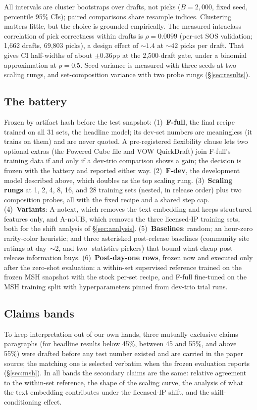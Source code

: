 All intervals are cluster bootstraps over drafts, not picks
($B{=}2{,}000$, fixed seed, percentile 95\% CIs); paired comparisons share
resample indices. Clustering matters little, but the choice is grounded
empirically. The measured intraclass correlation of pick correctness
within drafts is $\rho = 0.0099$ (per-set SOS validation; 1{,}662 drafts,
69{,}803 picks), a design effect of ${\sim}1.4$ at ${\sim}42$ picks per
draft. That gives CI half-widths of about $\pm0.36$pp at the
2{,}500-draft gate, under a binomial approximation at $p{=}0.5$. Seed
variance is measured with three seeds at two scaling rungs, and
set-composition variance with two probe rungs (\S\ref{sec:results}).

\subsection{The battery}

Frozen by artifact hash before the test snapshot:
(1)~\textbf{F-full}, the final recipe trained on all 31 sets, the headline
model; its dev-set numbers are meaningless (it trains on them) and are
never quoted. A pre-registered flexibility clause lets two optional extras
(the Powered Cube file and VOW QuickDraft) join F-full's training data if
and only if a dev-trio comparison shows a gain; the decision is frozen
with the battery and reported either way.
(2)~\textbf{F-dev}, the development model described above, which doubles
as the top scaling rung.
(3)~\textbf{Scaling rungs} at 1, 2, 4, 8, 16, and 28 training sets
(nested, in release order) plus two composition probes, all with the fixed
recipe and a shared step cap.
(4)~\textbf{Variants}: A-notext, which removes the text embedding and
keeps structured features only, and A-noUB, which removes the three
licensed-IP training sets, both for the shift analysis of
\S\ref{sec:analysis}.
(5)~\textbf{Baselines}: random; an hour-zero rarity-color heuristic; and
three asterisked post-release baselines (community site ratings at
day~$\sim$2, and two \seventeenlands{}-statistics pickers) that bound what
cheap post-release information buys.
(6)~\textbf{Post-day-one rows}, frozen now and executed only after the
zero-shot evaluation: a within-set supervised reference trained on the frozen MSH snapshot
with the stock per-set recipe, and F-full fine-tuned on the MSH training
split with hyperparameters pinned from dev-trio trial runs.

\subsection{Claims bands}

To keep interpretation out of our own hands, three mutually exclusive
claims paragraphs (for headline results below 45\%, between 45 and 55\%,
and above 55\%) were drafted before any test number existed and are
carried in the paper source; the matching one is selected verbatim when
the frozen evaluation reports (\S\ref{sec:msh}). In all bands the
secondary claims are the same: relative agreement to the within-set reference, the shape
of the scaling curve, the analysis of what the text embedding contributes
under the licensed-IP shift, and the skill-conditioning effect.
